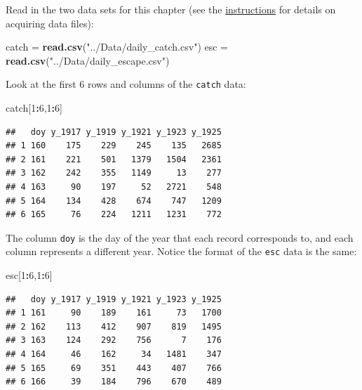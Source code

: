 \documentclass[]{book}
\newenvironment{Shaded}{\begin{snugshade}}{\end{snugshade}}
\newcommand{\KeywordTok}[1]{\textcolor[rgb]{0.13,0.29,0.53}{\textbf{#1}}}
\newcommand{\DecValTok}[1]{\textcolor[rgb]{0.00,0.00,0.81}{#1}}
\newcommand{\StringTok}[1]{\textcolor[rgb]{0.31,0.60,0.02}{#1}}
\newcommand{\OperatorTok}[1]{\textcolor[rgb]{0.81,0.36,0.00}{\textbf{#1}}}
\newcommand{\NormalTok}[1]{#1}
\theoremstyle{definition}
\theoremstyle{definition}
\theoremstyle{definition}
\theoremstyle{remark}
\begin{document}
Read in the two data sets for this chapter (see the
\protect\hyperlink{data-sets}{instructions} for details on acquiring
data files):

\begin{Shaded}
\begin{Highlighting}[]
\NormalTok{catch =}\StringTok{ }\KeywordTok{read.csv}\NormalTok{(}\StringTok{"../Data/daily_catch.csv"}\NormalTok{)}
\NormalTok{esc =}\StringTok{ }\KeywordTok{read.csv}\NormalTok{(}\StringTok{"../Data/daily_escape.csv"}\NormalTok{)}
\end{Highlighting}
\end{Shaded}

Look at the first 6 rows and columns of the \texttt{catch} data:

\begin{Shaded}
\begin{Highlighting}[]
\NormalTok{catch[}\DecValTok{1}\OperatorTok{:}\DecValTok{6}\NormalTok{,}\DecValTok{1}\OperatorTok{:}\DecValTok{6}\NormalTok{]}
\end{Highlighting}
\end{Shaded}

\begin{verbatim}
##   doy y_1917 y_1919 y_1921 y_1923 y_1925
## 1 160    175    229    245    135   2685
## 2 161    221    501   1379   1504   2361
## 3 162    242    355   1149     13    277
## 4 163     90    197     52   2721    548
## 5 164    134    428    674    747   1209
## 6 165     76    224   1211   1231    772
\end{verbatim}

The column \texttt{doy} is the day of the year that each record
corresponds to, and each column represents a different year. Notice the
format of the \texttt{esc} data is the same:

\begin{Shaded}
\begin{Highlighting}[]
\NormalTok{esc[}\DecValTok{1}\OperatorTok{:}\DecValTok{6}\NormalTok{,}\DecValTok{1}\OperatorTok{:}\DecValTok{6}\NormalTok{]}
\end{Highlighting}
\end{Shaded}

\begin{verbatim}
##   doy y_1917 y_1919 y_1921 y_1923 y_1925
## 1 161     90    189    161     73   1700
## 2 162    113    412    907    819   1495
## 3 163    124    292    756      7    176
## 4 164     46    162     34   1481    347
## 5 165     69    351    443    407    766
## 6 166     39    184    796    670    489
\end{verbatim}
\end{document}
